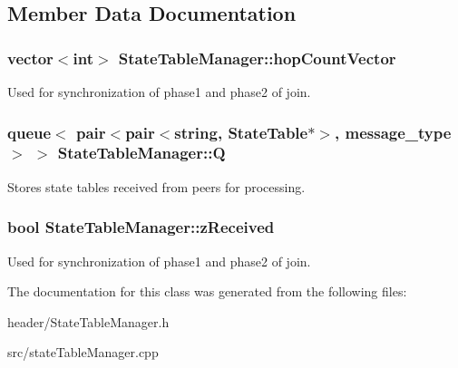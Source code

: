 \subsection{Member Data Documentation}
\hypertarget{classStateTableManager_a3846ef7fd2abcbf042e0a908e45c3fd4}{
\subsubsection[{hop\-Count\-Vector}]{\setlength{\rightskip}{0pt plus 5cm}vector$<$int$>$ State\-Table\-Manager\-::hop\-Count\-Vector}}\label{classStateTableManager_a3846ef7fd2abcbf042e0a908e45c3fd4}
Used for synchronization of phase1 and phase2 of join. \hypertarget{classStateTableManager_a6f7b7e7d9b63c79252aff1de8a13e3b7}{
\subsubsection[{Q}]{\setlength{\rightskip}{0pt plus 5cm}queue$<$ pair$<$pair$<$string, {\bf State\-Table}$\ast$$>$, message\-\_\-type$>$ $>$ State\-Table\-Manager\-::\-Q}}\label{classStateTableManager_a6f7b7e7d9b63c79252aff1de8a13e3b7}
Stores state tables received from peers for processing. \hypertarget{classStateTableManager_a9895a129ebb8725c0ecfb3907f1ae23a}{
\subsubsection[{z\-Received}]{\setlength{\rightskip}{0pt plus 5cm}bool State\-Table\-Manager\-::z\-Received}}\label{classStateTableManager_a9895a129ebb8725c0ecfb3907f1ae23a}
Used for synchronization of phase1 and phase2 of join. 

The documentation for this class was generated from the following files\-:\begin{DoxyCompactItemize}
\item 
header/State\-Table\-Manager.\-h\item 
src/state\-Table\-Manager.\-cpp\end{DoxyCompactItemize}
